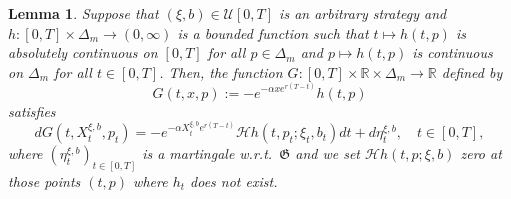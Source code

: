 \documentclass[reqno, 11pt]{amsart}%
\newcommand{\R}{\mathbb{R}}
\newtheorem{lemma}[theorem]{Lemma}
\theoremstyle{definition}
\numberwithin{equation}{section} \numberwithin{theorem}{section}
\begin{document}
\begin{lemma}\label{characG}
	Suppose that $(\xi,b)\in \mathcal U[0,T]$ is an arbitrary strategy and $h:[0,T]\times\Delta_m\to(0,\infty)$ is a bounded function such that $t\mapsto h(t,p)$ is absolutely continuous on $[0,T]$ for all $p\in\Delta_m$ and $p\mapsto h(t,p)$ is continuous on $\Delta_m$ for all $t\in[0,T]$. Then, the function $G:[0,T]\times\R\times\Delta_m\to\R$ defined by
	\begin{equation*}
	G(t,x,p) := -e^{-\alpha x e^{r(T-t)}}h(t,p)
	\end{equation*}
	satisfies
	\begin{equation*}
	d G(t,X^{\xi,b}_t,p_t)  = -e^{-\alpha X^{\xi,b}_t e^{r(T-t)}}\mathcal{H} h(t,p_t;\xi_t,b_t)dt + d\eta^{\xi,b}_t, \quad t\in[0,T],
	\end{equation*}
	where $(\eta^{\xi,b}_t)_{t\in[0,T]}$ is a martingale w.r.t.\ ${\mathfrak G}$ and we set $\mathcal{H} h(t,p;\xi,b)$ zero at those points $(t,p)$ where $h_t$ does not exist.
\end{lemma}
\end{document}
